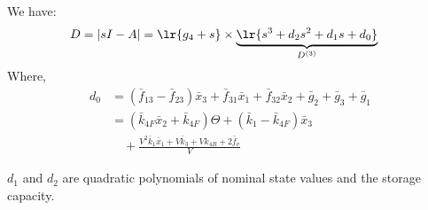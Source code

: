 We have:
\begin{align*}
    D = |sI-A| &= \lr{g_4 + s} \times \underbrace{\lr{s^3 + d_2 s^2 + d_1 s + d_0}}_{D^{(3)}}
\end{align*}
Where,
\begin{align*}
    d_0 &= \left(\bar f_{13} - \bar f_{23}\right) \bar x_{3} + \bar f_{31} \bar x_{1} + \bar f_{32} \bar x_{2} + \bar g_{2} + \bar g_{3} + \bar g_{1}\\
    &= \left(\bar k_{4F} \bar x_{2} + \bar k_{4F}\right) \Theta + \left(\bar k_{1} - \bar k_{4F}\right) \bar x_{3} \\
    &\quad + \frac{V^{2} \bar k_{1} \bar x_{1} + V \bar k_{3} + V k_{4R} + 2 \bar f_v}{V}
\end{align*}

$d_1$ and $d_2$ are quadratic polynomials of nominal state values and
the storage capacity.

